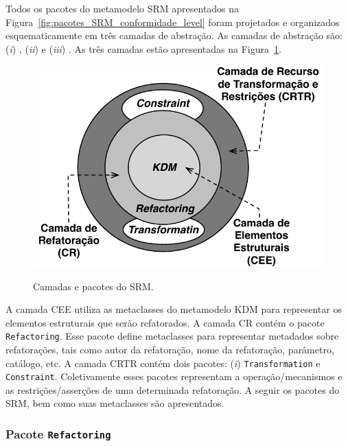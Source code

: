Todos os pacotes do metamodelo SRM apresentados na Figura~\ref{fig:pacotes_SRM_conformidade_level} foram projetados e organizados esquematicamente em três camadas de abstração. As camadas de abstração são: (\textit{i}) , (\textit{ii})  e (\textit{iii}) . As três camadas estão apresentadas na Figura~\ref{fig:camadas_e_pacotes_do_srm}.

\begin{figure}[h]
	\centering
		\caption{Camadas e pacotes do SRM.}
	\includegraphics[scale=0.77]{images/LayerSRM}
	\label{fig:camadas_e_pacotes_do_srm}
	\fautor
\end{figure}

A camada CEE utiliza as metaclasses do metamodelo KDM para representar os elementos estruturais que serão refatorados. A camada CR contém o pacote \texttt{Refactoring}. Esse pacote define metaclasses para representar metadados sobre refatorações, tais como autor da refatoração, nome da refatoração, parâmetro, catálogo, etc. A camada CRTR contém dois pacotes: (\textit{i})  \texttt{Transformation} e \texttt{Constraint}. Coletivamente esses pacotes representam a operação/mecanismos e as restrições/asserções de uma determinada refatoração. A seguir os pacotes do SRM, bem como suas metaclasses são apresentados.

\subsubsection{Pacote \texttt{Refactoring}}

